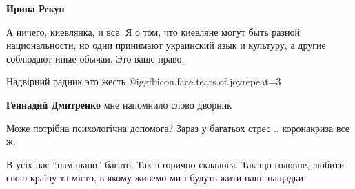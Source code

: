 \begin{itemize}
\begin{itemize}
\textbf{Ирина Рекун} 

А ничего, киевлянка, и все. Я о том, что киевляне могут быть разной
национальности, но одни принимают украинский язык и культуру, а другие
соблюдают иные обычаи. Это ваше право.

\end{itemize} %

Надвірний радник это жесть  @igg{fbicon.face.tears.of.joy}{repeat=3} 

\textbf{Геннадий Дмитренко} мне напомнило слово дворник

Може потрібна психологічна допомога? Зараз у багатьох стрес .. коронакриза все ж.


В усіх нас \enquote{намішано} багато. Так історично склалося. Так що головне, любити
свою країну та місто, в якому живемо ми і будуть жити наші нащадки.

\end{itemize} %
